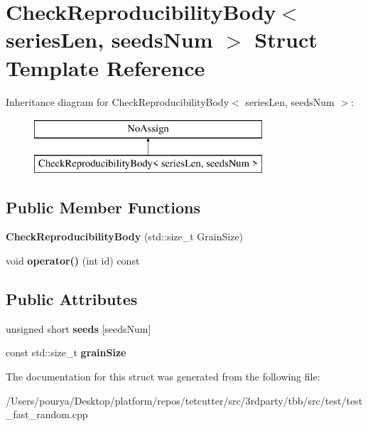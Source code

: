 \hypertarget{structCheckReproducibilityBody}{}\section{Check\+Reproducibility\+Body$<$ series\+Len, seeds\+Num $>$ Struct Template Reference}
\label{structCheckReproducibilityBody}
Inheritance diagram for Check\+Reproducibility\+Body$<$ series\+Len, seeds\+Num $>$\+:\begin{figure}[H]
\begin{center}
\leavevmode
\includegraphics[height=2.000000cm]{structCheckReproducibilityBody}
\end{center}
\end{figure}
\subsection*{Public Member Functions}
\begin{DoxyCompactItemize}
\item 
\hypertarget{structCheckReproducibilityBody_a00f64418c9aca5097ce20d4b8fcbc558}{}{\bfseries Check\+Reproducibility\+Body} (std\+::size\+\_\+t Grain\+Size)\label{structCheckReproducibilityBody_a00f64418c9aca5097ce20d4b8fcbc558}

\item 
\hypertarget{structCheckReproducibilityBody_a4f79b48e6e46adc411a0e8c93825cd9e}{}void {\bfseries operator()} (int id) const \label{structCheckReproducibilityBody_a4f79b48e6e46adc411a0e8c93825cd9e}

\end{DoxyCompactItemize}
\subsection*{Public Attributes}
\begin{DoxyCompactItemize}
\item 
\hypertarget{structCheckReproducibilityBody_a373dad60b756489972f26a01689e920b}{}unsigned short {\bfseries seeds} \mbox{[}seeds\+Num\mbox{]}\label{structCheckReproducibilityBody_a373dad60b756489972f26a01689e920b}

\item 
\hypertarget{structCheckReproducibilityBody_a3b421998d86fa8cd7cc53c0cbc19ac5c}{}const std\+::size\+\_\+t {\bfseries grain\+Size}\label{structCheckReproducibilityBody_a3b421998d86fa8cd7cc53c0cbc19ac5c}

\end{DoxyCompactItemize}


The documentation for this struct was generated from the following file\+:\begin{DoxyCompactItemize}
\item 
/\+Users/pourya/\+Desktop/platform/repos/tetcutter/src/3rdparty/tbb/src/test/test\+\_\+fast\+\_\+random.\+cpp\end{DoxyCompactItemize}
